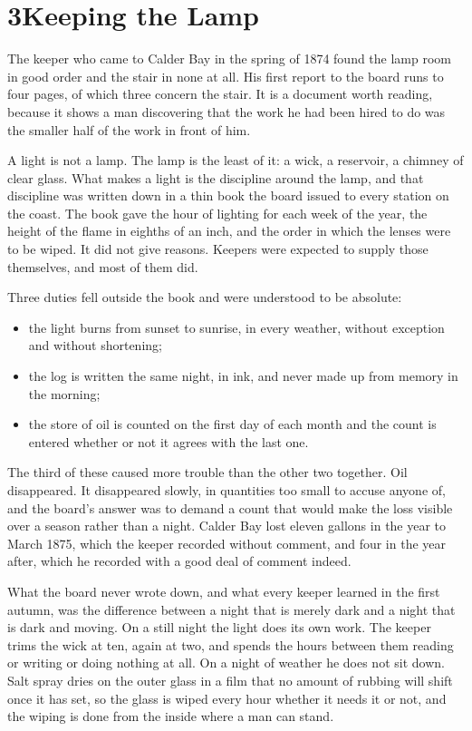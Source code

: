 \documentclass[11pt,twoside]{book}
\begin{document}
\section*{3\quad Keeping the Lamp}

The keeper who came to Calder Bay in the spring of 1874 found the lamp room
in good order and the stair in none at all. His first report to the board
runs to four pages, of which three concern the stair. It is a document worth
reading, because it shows a man discovering that the work he had been hired
to do was the smaller half of the work in front of him.

A light is not a lamp. The lamp is the least of it: a wick, a reservoir, a
chimney of clear glass. What makes a light is the discipline around the lamp,
and that discipline was written down in a thin book the board issued to every
station on the coast. The book gave the hour of lighting for each week of the
year, the height of the flame in eighths of an inch, and the order in which
the lenses were to be wiped. It did not give reasons. Keepers were expected
to supply those themselves, and most of them did.

Three duties fell outside the book and were understood to be absolute:

\begin{itemize}
  \setlength{\itemsep}{0.15em}
  \item the light burns from sunset to sunrise, in every weather, without
        exception and without shortening;
  \item the log is written the same night, in ink, and never made up from
        memory in the morning;
  \item the store of oil is counted on the first day of each month and the
        count is entered whether or not it agrees with the last one.
\end{itemize}

The third of these caused more trouble than the other two together. Oil
disappeared. It disappeared slowly, in quantities too small to accuse anyone
of, and the board's answer was to demand a count that would make the loss
visible over a season rather than a night. Calder Bay lost eleven gallons in
the year to March 1875, which the keeper recorded without comment, and four
in the year after, which he recorded with a good deal of comment indeed.

\newpage

What the board never wrote down, and what every keeper learned in the first
autumn, was the difference between a night that is merely dark and a night
that is dark and moving. On a still night the light does its own work. The
keeper trims the wick at ten, again at two, and spends the hours between
them reading or writing or doing nothing at all. On a night of weather he
does not sit down. Salt spray dries on the outer glass in a film that no
amount of rubbing will shift once it has set, so the glass is wiped every
hour whether it needs it or not, and the wiping is done from the inside
where a man can stand.
\end{document}
